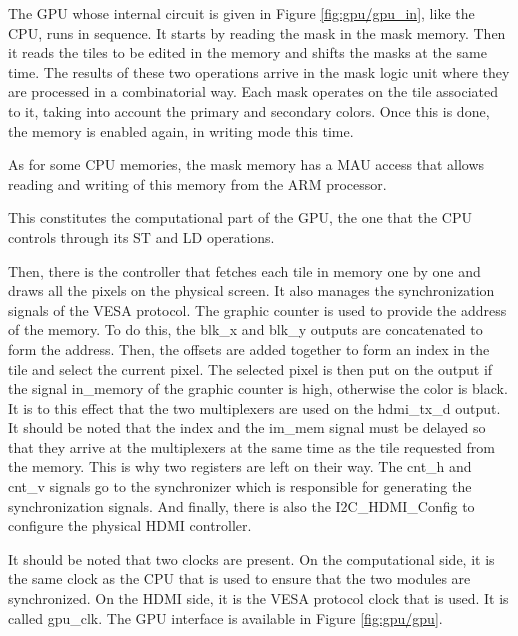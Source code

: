 The GPU whose internal circuit is given in Figure \ref{fig:gpu/gpu_in}, like the CPU, runs in 
sequence. It starts by reading the mask in the mask memory. Then it reads the tiles to be edited in 
the memory and shifts the masks at the same time. The results of these two operations arrive in the 
mask logic unit where they are processed in a combinatorial way. Each mask operates on the tile 
associated to it, taking into account the primary and secondary colors. Once this is done, the 
memory is enabled again, in writing mode this time. 

As for some CPU memories, the mask memory has a MAU access that allows reading and writing of this 
memory from the ARM processor.

This constitutes the computational part of the GPU, the one that the CPU controls through its ST and 
LD operations. 

Then, there is the controller that fetches each tile in memory one by one and draws all the pixels
on the physical screen. 
It also manages the synchronization signals of the VESA protocol. The graphic counter is used to 
provide the address of the memory. To do this, the blk\_x and blk\_y outputs are concatenated to 
form the address. Then, the offsets are added together to form an index in the tile and select the current 
pixel. The selected pixel is then put on the output if the signal in\_memory of the graphic counter 
is high, otherwise the color is black. It is to this effect that the two multiplexers are used on 
the hdmi\_tx\_d output. It should be noted that the index and the im\_mem signal must be delayed so 
that they arrive at the multiplexers at the same time as the tile requested from the memory. This 
is why two registers are left on their way. The cnt\_h and cnt\_v signals go to the synchronizer 
which is responsible for generating the synchronization signals. And finally, there is also the 
I2C\_HDMI\_Config to configure the physical HDMI controller.

It should be noted that two clocks are present. On the computational side, it is the same clock as 
the CPU that is used to ensure that the two modules are synchronized. On the HDMI side, it is the 
VESA protocol clock that is used. It is called gpu\_clk. The GPU interface is available in Figure
\ref{fig:gpu/gpu}.

